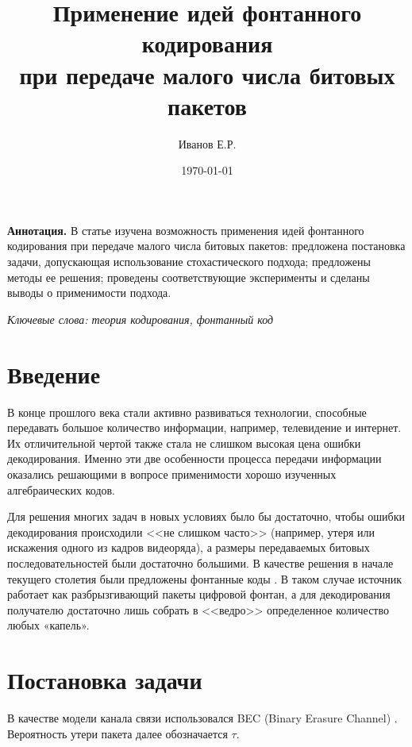 



\title{Применение идей фонтанного кодирования\\ при передаче малого числа
битовых пакетов}
\author{Иванов Е.Р.}
\date{\today}

\maketitle
    
\textbf{Аннотация.} В статье изучена возможность
применения идей фонтанного кодирования
при передаче малого числа битовых пакетов:
предложена постановка задачи, допускающая использование
стохастического подхода; предложены
методы ее решения; проведены соответствующие эксперименты
и сделаны выводы о применимости подхода.

\textit{Ключевые слова: теория кодирования, фонтанный код}

\section{Введение}

В конце прошлого века стали активно развиваться технологии,
способные передавать большое количество информации,
например, телевидение и интернет.
Их отличительной чертой также стала не слишком 
высокая цена ошибки декодирования. Именно эти две
особенности процесса передачи информации оказались
решающими в вопросе применимости хорошо изученных 
алгебраических кодов.

Для решения многих задач в новых условиях было бы достаточно, чтобы
ошибки декодирования происходили <<не слишком часто>>
(например, утеря или искажения одного из кадров видеоряда),
а размеры передаваемых битовых последовательностей были
достаточно большими. В качестве решения в начале текущего столетия
были предложены фонтанные коды \cite{MacKay2005Dec, Kythe2017}. В таком случае 
источник работает как
разбрызгивающий пакеты цифровой
фонтан, а для декодирования получателю достаточно лишь собрать в 
<<ведро>> определенное количество
любых «капель».

\section{Постановка задачи}

В качестве модели канала связи использовался BEC (Binary Erasure Channel)
\cite{Kythe2017}. Вероятность утери пакета далее обозначается $\tau$.

